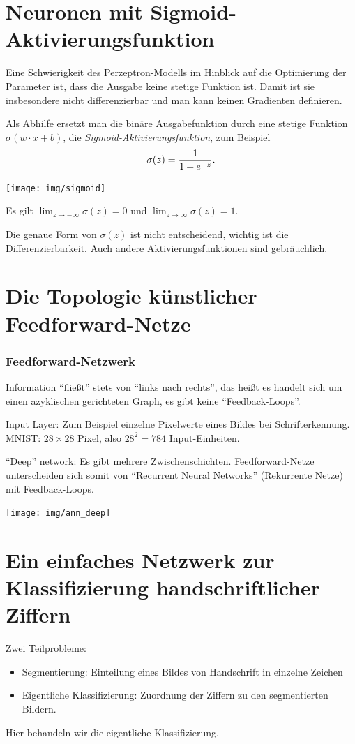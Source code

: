 \documentclass[
 a4paper,
 12pt,
 parskip=half
 ]{scrreprt}
\theoremstyle{plain}
\theoremstyle{definition}
\begin{document}
\section{Neuronen mit Sigmoid-Aktivierungsfunktion}
Eine Schwierigkeit des Perzeptron-Modells im Hinblick auf die Optimierung der
Parameter ist, dass die Ausgabe keine stetige Funktion ist. Damit ist sie
insbesondere nicht differenzierbar und man kann keinen Gradienten definieren.

Als Abhilfe ersetzt man die binäre Ausgabefunktion durch eine stetige Funktion
$\sigma(w \cdot x + b)$, die \emph{Sigmoid-Aktivierungsfunktion}, zum Beispiel
\[ \sigma(z) = \frac{1}{1+e^{-z}}. \]
\begin{center}
  \texttt{[image: img/sigmoid]}
\end{center}

Es gilt $\lim_{z \to -\infty} \sigma(z) = 0$ und $\lim_{z \to \infty} \sigma(z)
= 1$.

Die genaue Form von $\sigma(z)$ ist nicht entscheidend, wichtig ist die
Differenzierbarkeit. Auch andere Aktivierungsfunktionen sind gebräuchlich.

\section{Die Topologie künstlicher Feedforward-Netze}
\subsubsection*{Feedforward-Netzwerk}
Information ``fließt'' stets von ``links nach rechts'', das heißt es handelt
sich um einen azyklischen gerichteten Graph, es gibt keine ``Feedback-Loops''.

Input Layer: Zum Beispiel einzelne Pixelwerte eines Bildes bei Schrifterkennung.
MNIST: $28 \times 28$ Pixel, also $28^2 = 784$ Input-Einheiten.

``Deep'' network: Es gibt mehrere Zwischenschichten. Feedforward-Netze
unterscheiden sich somit von ``Recurrent Neural Networks'' (Rekurrente Netze)
mit Feedback-Loops.

\begin{center}
  \texttt{[image: img/ann\_deep]}
\end{center}

\section{Ein einfaches Netzwerk zur Klassifizierung handschriftlicher Ziffern}
Zwei Teilprobleme:
\begin{itemize}
\item Segmentierung: Einteilung eines Bildes von Handschrift in einzelne Zeichen
\item Eigentliche Klassifizierung: Zuordnung der Ziffern zu den segmentierten
  Bildern.
\end{itemize}
Hier behandeln wir die eigentliche Klassifizierung.
\end{document}
